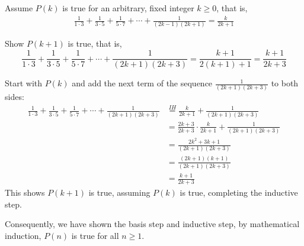 \documentclass[12pt,addpoints]{exam}
\begin{document}
\begin{questions}
\begin{solution}
Assume $P(k)$ is true for an arbitrary, fixed integer $k \geq 0$, that is,
\begin{align*}
	\frac{1}{1\cdot 3} + \frac{1}{3\cdot 5} + \frac{1}{5\cdot 7} + \cdots + \frac{1}{(2k-1)(2k+1)} = \frac{k}{2k+1} \tag{IH}
\end{align*}

Show $P(k+1)$ is true, that is, 
\[ \frac{1}{1\cdot 3} + \frac{1}{3\cdot 5} + \frac{1}{5\cdot 7} + \cdots + \frac{1}{(2k+1)(2k+3)} = \frac{k+1}{2(k+1)+1} = \frac{k+1}{2k+3} \]

Start with $P(k)$ and add the next term of the sequence $\frac{1}{(2k+1)(2k+3)}$ to both sides:
\begin{align*}
	\frac{1}{1\cdot 3} + \frac{1}{3\cdot 5} + \frac{1}{5\cdot 7} + \cdots + \frac{1}{(2k+1)(2k+3)} &\overset{IH}{=} \frac{k}{2k+1} + \frac{1}{(2k+1)(2k+3)} \\
	&= \frac{2k+3}{2k+3}\cdot\frac{k}{2k+1} + \frac{1}{(2k+1)(2k+3)} \\
	&= \frac{2k^2 + 3k + 1}{(2k+1)(2k+3)} \\
	&= \frac{(2k+1)(k+1)}{(2k+1)(2k+3)} \\
	&= \frac{k+1}{2k+3}
\end{align*}
This shows $P(k+1)$ is true, assuming $P(k)$ is true, completing the inductive step.

\smallskip
Consequently, we have shown the basis step and inductive step, by mathematical induction, $P(n)$ is true for all $n \geq 1$.
\end{solution}



\end{questions}
\end{document}
